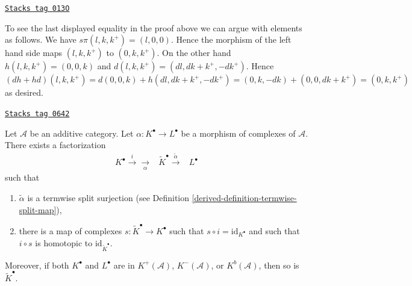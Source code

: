 \begin{remark}
\label{derived-remark-compute-modules}
\href{https://stacks.math.columbia.edu/tag/013O}{\texttt{Stacks tag 013O}}

To see the last displayed equality in the proof above we can argue
with elements as follows. We have
$s\pi(l, k, k^{+}) = (l, 0, 0)$.
Hence the morphism of the left hand side maps
$(l, k, k^{+})$ to $(0, k, k^{+})$.
On the other hand $h(l, k, k^{+}) = (0, 0, k)$ and
$d(l, k, k^{+}) = (dl, dk + k^{+}, -dk^{+})$.
Hence $(dh + hd)(l, k, k^{+}) =
d(0, 0, k) + h(dl, dk + k^{+}, -dk^{+}) =
(0, k, -dk) + (0, 0, dk + k^{+}) = (0, k, k^{+})$
as desired.
\end{remark}

\begin{lemma}
\label{derived-lemma-make-surjective}
\href{https://stacks.math.columbia.edu/tag/0642}{\texttt{Stacks tag 0642}}

Let $\mathcal{A}$ be an additive category.
Let $\alpha : K^\bullet \to L^\bullet$ be a morphism
of complexes of $\mathcal{A}$.
There exists a factorization
$$
\begin{array}{ccc}K^\bullet \overset{i}{\longrightarrow}\underset{\alpha}{\longrightarrow} & \tilde K^\bullet \overset{\tilde \alpha}{\longrightarrow} & L^\bullet\end{array}
$$
such that
\begin{enumerate}
\item $\tilde \alpha$ is a termwise split surjection (see
Definition \ref{derived-definition-termwise-split-map}),
\item there is a map of complexes $s : \tilde K^\bullet \to K^\bullet$
such that $s \circ i = \text{id}_{K^\bullet}$ and such that
$i \circ s$ is homotopic to $\text{id}_{\tilde K^\bullet}$.
\end{enumerate}
Moreover, if both $K^\bullet$ and $L^\bullet$ are in
$K^{+}(\mathcal{A})$, $K^{-}(\mathcal{A})$, or $K^b(\mathcal{A})$,
then so is $\tilde K^\bullet$.
\end{lemma}

